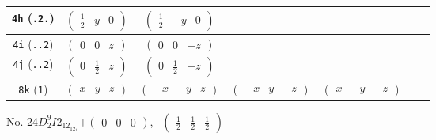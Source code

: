 \documentclass[fleqn,9pt,landscape]{jsarticle}
\begin{document}
\begin{center}
\begin{longtable}{ccccccc}
{\tt 4h} ({\tt .2.}) & $ \begin{pmatrix} \frac{1}{2} & y & 0 \end{pmatrix} $ & $ \begin{pmatrix} \frac{1}{2} & - y & 0 \end{pmatrix} $ & $  $ & $  $ \\ \hline
{\tt 4i} ({\tt ..2}) & $ \begin{pmatrix} 0 & 0 & z \end{pmatrix} $ & $ \begin{pmatrix} 0 & 0 & - z \end{pmatrix} $ & $  $ & $  $ \\ \hline
{\tt 4j} ({\tt ..2}) & $ \begin{pmatrix} 0 & \frac{1}{2} & z \end{pmatrix} $ & $ \begin{pmatrix} 0 & \frac{1}{2} & - z \end{pmatrix} $ & $  $ & $  $ \\ \hline
{\tt 8k} ({\tt 1}) & $ \begin{pmatrix} x & y & z \end{pmatrix} $ & $ \begin{pmatrix} - x & - y & z \end{pmatrix} $ & $ \begin{pmatrix} - x & y & - z \end{pmatrix} $ & $ \begin{pmatrix} x & - y & - z \end{pmatrix} $ \\
\end{longtable}
\end{center}
\newpage
No. 24\quad$D_{2}^{9}$\quad$I2_12_12_1$\quad[ orthorhombic ]\quad$+\begin{pmatrix} 0 & 0 & 0 \end{pmatrix}$,\quad $+\begin{pmatrix} \frac{1}{2} & \frac{1}{2} & \frac{1}{2} \end{pmatrix}$
\end{document}

